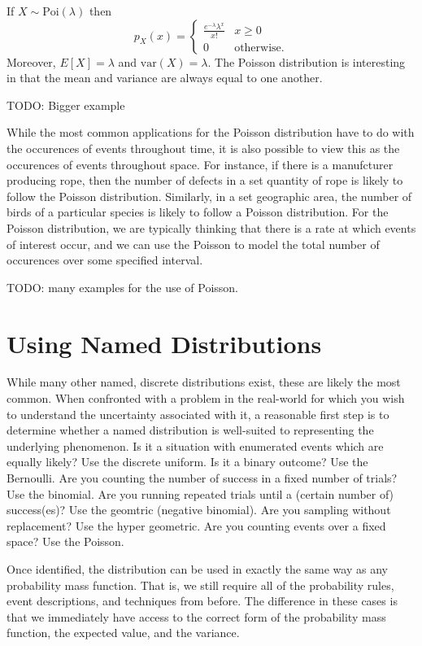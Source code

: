 \documentclass[
  letterpaper,
  DIV=11,
  numbers=noendperiod]{scrreprt}
\begin{document}
If \(X\sim\text{Poi}(\lambda)\) then
\[p_X(x) = \begin{cases} \frac{e^{-\lambda}\lambda^x}{x!} & x \geq 0 \\ 0 &\text{otherwise}.\end{cases}\]
Moreover, \(E[X]=\lambda\) and \(\text{var}(X) = \lambda\). The Poisson
distribution is interesting in that the mean and variance are always
equal to one another.

TODO: Bigger example

While the most common applications for the Poisson distribution have to
do with the occurences of events throughout time, it is also possible to
view this as the occurences of events throughout space. For instance, if
there is a manufcturer producing rope, then the number of defects in a
set quantity of rope is likely to follow the Poisson distribution.
Similarly, in a set geographic area, the number of birds of a particular
species is likely to follow a Poisson distribution. For the Poisson
distribution, we are typically thinking that there is a rate at which
events of interest occur, and we can use the Poisson to model the total
number of occurences over some specified interval.

TODO: many examples for the use of Poisson.

\section{Using Named Distributions}\label{using-named-distributions}

While many other named, discrete distributions exist, these are likely
the most common. When confronted with a problem in the real-world for
which you wish to understand the uncertainty associated with it, a
reasonable first step is to determine whether a named distribution is
well-suited to representing the underlying phenomenon. Is it a situation
with enumerated events which are equally likely? Use the discrete
uniform. Is it a binary outcome? Use the Bernoulli. Are you counting the
number of success in a fixed number of trials? Use the binomial. Are you
running repeated trials until a (certain number of) success(es)? Use the
geomtric (negative binomial). Are you sampling without replacement? Use
the hyper geometric. Are you counting events over a fixed space? Use the
Poisson.

Once identified, the distribution can be used in exactly the same way as
any probability mass function. That is, we still require all of the
probability rules, event descriptions, and techniques from before. The
difference in these cases is that we immediately have access to the
correct form of the probability mass function, the expected value, and
the variance.
\end{document}

